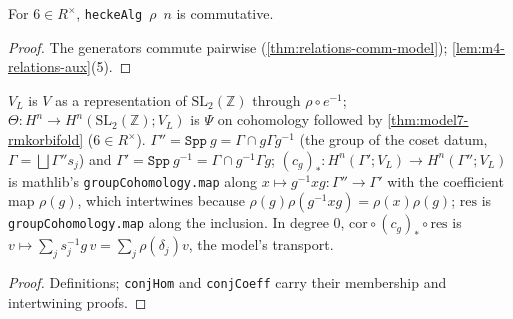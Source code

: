 \begin{corollary}\label{obl:algebra-model}
  \leanok
  For $6\in R^\times$, \texttt{heckeAlg}~$\rho$~$n$ is commutative.
\end{corollary}
\begin{proof}
  \leanok
  The generators commute pairwise (\ref{thm:relations-comm-model}); \ref{lem:m4-relations-aux}(5).
\end{proof}

\begin{definition}\label{def:m4-classical}
  \leanok
  $V_L$ is $V$ as a representation of $\mathrm{SL}_2(\mathbb Z)$ through $\rho\circ e^{-1}$; $\Theta\colon H^n\to
  H^n(\mathrm{SL}_2(\mathbb Z);V_L)$ is $\Psi$ on cohomology followed by \ref{thm:model7-rmkorbifold} ($6\in R^\times$).
  $\Gamma''=\texttt{Spp}~g=\Gamma\cap g\Gamma g^{-1}$ (the group of the coset datum, $\Gamma=\bigsqcup\Gamma''s_j$) and
  $\Gamma'=\texttt{Spp}~g^{-1}=\Gamma\cap g^{-1}\Gamma g$; $(c_g)_*\colon H^n(\Gamma';V_L)\to H^n(\Gamma'';V_L)$ is mathlib's
  \texttt{groupCohomology.map} along $x\mapsto g^{-1}xg\colon\Gamma''\to\Gamma'$ with the coefficient map $\rho(g)$, which intertwines
  because $\rho(g)\rho(g^{-1}xg)=\rho(x)\rho(g)$; $\mathrm{res}$ is \texttt{groupCohomology.map} along the inclusion. In degree $0$,
  $\mathrm{cor}\circ(c_g)_*\circ\mathrm{res}$ is $v\mapsto\sum_j s_j^{-1}g\,v=\sum_j\rho(\delta_j)v$, the model's transport.
\end{definition}
\begin{proof}
  \leanok
  Definitions; \texttt{conjHom} and \texttt{conjCoeff} carry their membership and intertwining proofs.
\end{proof}

